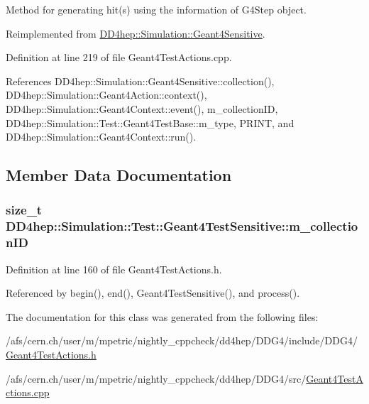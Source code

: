 Method for generating hit(s) using the information of G4Step object. 

Reimplemented from \hyperlink{class_d_d4hep_1_1_simulation_1_1_geant4_sensitive_a9a9463a6c29a66dad43a52ffc9f7838d}{DD4hep::Simulation::Geant4Sensitive}.

Definition at line 219 of file Geant4TestActions.cpp.

References DD4hep::Simulation::Geant4Sensitive::collection(), DD4hep::Simulation::Geant4Action::context(), DD4hep::Simulation::Geant4Context::event(), m\_\-collectionID, DD4hep::Simulation::Test::Geant4TestBase::m\_\-type, PRINT, and DD4hep::Simulation::Geant4Context::run().

\subsection{Member Data Documentation}
\hypertarget{class_d_d4hep_1_1_simulation_1_1_test_1_1_geant4_test_sensitive_a2b6048929e3f19fbe4e2f9eb4fe8e77a}{
\subsubsection[{m\_\-collectionID}]{\setlength{\rightskip}{0pt plus 5cm}size\_\-t {\bf DD4hep::Simulation::Test::Geant4TestSensitive::m\_\-collectionID}}}
\label{class_d_d4hep_1_1_simulation_1_1_test_1_1_geant4_test_sensitive_a2b6048929e3f19fbe4e2f9eb4fe8e77a}


Definition at line 160 of file Geant4TestActions.h.

Referenced by begin(), end(), Geant4TestSensitive(), and process().

The documentation for this class was generated from the following files:\begin{DoxyCompactItemize}
\item 
/afs/cern.ch/user/m/mpetric/nightly\_\-cppcheck/dd4hep/DDG4/include/DDG4/\hyperlink{_geant4_test_actions_8h}{Geant4TestActions.h}\item 
/afs/cern.ch/user/m/mpetric/nightly\_\-cppcheck/dd4hep/DDG4/src/\hyperlink{_geant4_test_actions_8cpp}{Geant4TestActions.cpp}\end{DoxyCompactItemize}
